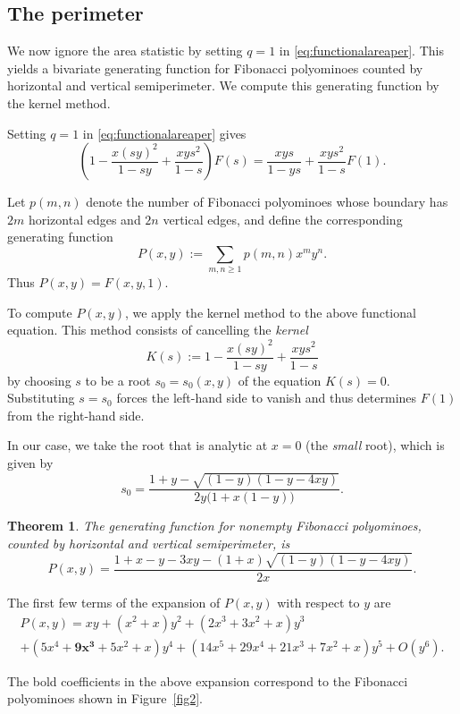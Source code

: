 \documentclass[12pt]{amsart}
\theoremstyle{plain}
\newtheorem{theorem}{Theorem}[section]
\theoremstyle{definition}
\begin{document}
\subsection{The perimeter}
We now ignore the area statistic by setting $q=1$ in
\eqref{eq:functionalareaper}. This yields a bivariate generating function for Fibonacci polyominoes counted by horizontal and vertical
semiperimeter. We compute this generating function by the kernel method.

Setting $q=1$ in \eqref{eq:functionalareaper} gives
$$\left(1-\frac{x (sy)^{2}}{1-sy} + \frac{xy s^2}{1-s} \right) F(s)
= \frac{xys}{1-ys}
+ \frac{xys^2}{1-s} F(1)
.$$ 

Let $p(m,n)$ denote the number of Fibonacci polyominoes whose boundary has $2m$ horizontal edges and $2n$ vertical edges, and define the corresponding generating function
$$P(x,y):=\sum_{m, n\geq 1} p(m,n)x^m y^n.$$
Thus $P(x,y)=F(x,y,1)$.

To compute $P(x,y)$, we apply the kernel method \cite{ban, banf, pro} to the above functional equation. This method consists of cancelling the \emph{kernel}
\[
K(s):=1-\frac{x(sy)^2}{1-sy}+\frac{xys^2}{1-s}
\]
by choosing $s$ to be a root  $s_0=s_0(x,y)$ of the equation $K(s)=0$. Substituting $s=s_0$ forces the left-hand side to vanish and thus  determines $F(1)$ from the right-hand side.

In our case, we take the root that is analytic at $x=0$ (the \emph{small} root), which is given by
\[
s_0=\frac{1+y-\sqrt{(1-y)(1-y-4xy)}}{2y\bigl(1+x(1-y)\bigr)}.
\]

\begin{theorem}\label{teorperimetro}
The generating function for nonempty Fibonacci polyominoes, counted by horizontal and vertical semiperimeter, is
\[P(x,y)=\frac{1 + x - y - 3 x y -(1+x)\sqrt{(1 - y) (1 - y - 4 x y)}}{2x}.\]
\end{theorem}

The first few terms of the expansion of $P(x,y)$ with respect to $y$ are
\begin{multline*}
 P(x,y)=   x y+\left(x^2+x\right) y^2+\left(2 x^3+3 x^2+x\right) y^3\\+\left(5 x^4+\bm{9 x^3}+5 x^2+x\right)
   y^4+\left(14 x^5+29 x^4+21 x^3+7 x^2+x\right) y^5+O\left(y^6\right).
\end{multline*}

The bold coefficients in the above expansion correspond to the Fibonacci polyominoes shown in Figure~\ref{fig2}.
\end{document}
